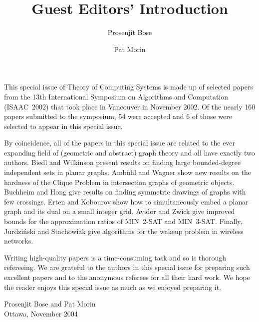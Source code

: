 \documentclass{article}
\title{Guest Editors' Introduction}
\author{Prosenjit Bose \and Pat Morin}
\date{}
\begin{document}
\maketitle

This special issue of Theory of Computing Systems is made up of
selected papers from the 13th International Symposium on Algorithms
and Computation (ISAAC~2002) that took place in Vancouver in November
2002.  Of the nearly 160 papers submitted to the symposium, 54 were
accepted and 6 of those were selected to appear in this special issue.

By coincidence, all of the papers in this special issue are related to
the ever expanding field of (geometric and abstract) graph theory and
all have exactly two authors.  \mbox{Biedl} and \mbox{Wilkinson}
present results on finding large bounded-degree independent sets in
planar graphs.  \mbox{Amb\"uhl} and \mbox{Wagner} show new results on
the hardness of the Clique Problem in intersection graphs of geometric
objects.  \mbox{Buchheim} and \mbox{Hong} give results on finding
symmetric drawings of graphs with few crossings.  \mbox{Erten} and
\mbox{Kobourov} show how to simultaneously embed a planar graph and
its dual on a small integer grid.  \mbox{Avidor} and \mbox{Zwick} give
improved bounds for the approximation ratios of MIN~2-SAT and
MIN~3-SAT.  Finally, \mbox{Jurdzi\'nski} and \mbox{Stachowiak} give
algorithms for the wakeup problem in wireless networks.

Writing high-quality papers is a time-consuming task and so is
thorough refereeing.  We are grateful to the authors in this special
issue for preparing such excellent papers and to the anonymous
referees for all their hard work.  We hope the reader enjoys this
special issue as much as we enjoyed preparing it.

\noindent
Prosenjit Bose and Pat Morin \\
Ottawa, November 2004
\end{document}
